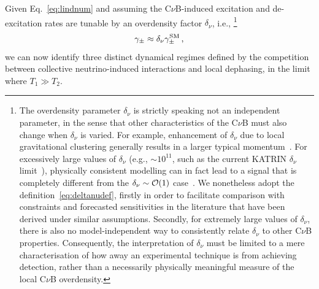 \documentclass[aps,prd,10pt,twocolumn,superscriptaddress,floatfix,nofootinbib,amsmath,amssymb,altaffilletter,preprintnumbers]{revtex4-1}
\begin{document}
Given Eq.~\eqref{eq:lindnum} and assuming the C$\nu$B-induced excitation and de-excitation rates are tunable by an overdensity factor $\delta_\nu$, i.e.,%
%
\footnote{The overdensity parameter $\delta_\nu$ is strictly speaking not an independent parameter, in the sense that other characteristics of the C$\nu$B must also change when $\delta_\nu$ is varied.  For example, enhancement of $\delta_\nu$ due to local gravitational clustering generally results in a larger typical momentum~\cite{Ringwald:2004np}. For excessively large values of $\delta_\nu$ (e.g., $\sim 10^{11}$, such as the current KATRIN $\delta_\nu$ limit~\cite{KATRIN:2022kkv}), physically consistent modelling can in fact lead to a signal that is completely different from the $\delta_\nu \sim {\cal O}(1)$ case~\cite{Bondarenko:2023ukx}.  We nonetheless adopt the definition~\eqref{eq:deltanudef}, firstly in order to facilitate comparison with constraints and forecasted sensitivities in the literature that have been derived under similar assumptions.  Secondly, for extremely large values of $\delta_\nu$, there is also no model-independent way to consistently relate $\delta_\nu$ to other C$\nu$B properties.  Consequently, the interpretation of $\delta_\nu$ must be limited to a mere characterisation of how away an experimental technique is from achieving detection, rather than a necessarily physically meaningful measure of the local C$\nu$B overdensity.\label{footnote:deltanu}}
%
\begin{equation}
\gamma_\pm \approx \delta_\nu \gamma_\pm^{\rm SM}\,,
\label{eq:deltanudef}
\end{equation} we can now identify three distinct dynamical regimes defined by the competition between collective neutrino-induced interactions and local dephasing,  in the limit where $T_1\gg T_2$. 
\end{document}
